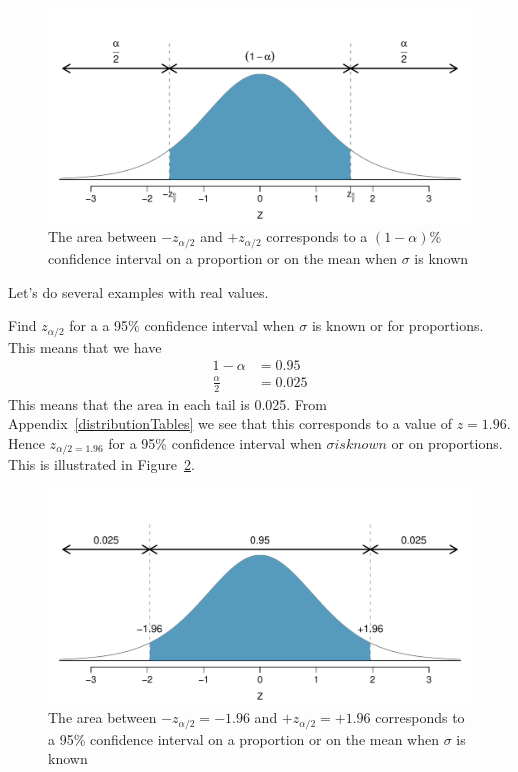 \vspace{-1.00cm}
\begin{figure}[H]
\centering
\includegraphics[width=\textwidth]{04-5/figures2/choosingZForCIGeneral/choosingZForCIGeneral.pdf}
\caption{The area between $-z_{\alpha/2}$ and $+z_{\alpha/2}$ corresponds to a $(1-\alpha)$\% confidence interval on a proportion or on the mean when $\sigma$ is known}
\label{choosingZForCIGenCase}
\end{figure}

Let's do several examples with real values.

\begin{example}{Find $z_{\alpha/2}$ for a a 95\% confidence interval when $\sigma$ is known or for proportions.} \label{exampleZalpha95CI} 
This means that we have
\begin{align}
1 - \alpha 		& = 0.95	\\
\frac{\alpha}{2}	& = 0.025
\end{align}
This means that the area in each tail is 0.025.
From Appendix~\ref{distributionTables} we see that this corresponds to a value of $z = 1.96$.
Hence $z_{\alpha/2 = 1.96}$ for a 95\% confidence interval when $\sigma is known$ or on proportions.
This is illustrated in Figure~\ref{choosingZFor95CI}.
\begin{figure}[H]
\centering
\includegraphics[width=\textwidth]{04-5/figures2/choosingZFor95CI/choosingZFor95CI.pdf}
\caption{The area between $-z_{\alpha/2}=-1.96$ and $+z_{\alpha/2}=+1.96$ corresponds to a 
95\% confidence interval on a proportion or on the mean when $\sigma$ is known}
\label{choosingZFor95CI}
\end{figure}
\end{example}



